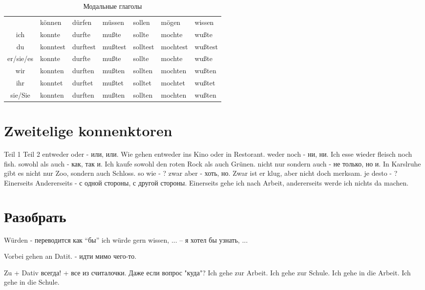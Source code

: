 \documentclass[12pt,a4paper]{report}
\begin{document}
\begin{longtable}{ c l l l l l l }
\caption{Модальные глаголы} \label{tab:long} \\
				& können 	& dürfen 	& müssen 	& sollen 	& mögen 	& wissen 	\\
	
	ich 		& konnte 	& durfte 	& mußte 	& sollte 	& mochte 	& wußte 	\\
	du 			& konntest 	& durftest	& mußtest	& solltest	& mochtest	& wußtest 	\\
	er/sie/es 	& konnte 	& durfte 	& mußte		& sollte	& mochte	& wußte		\\
	wir 		& konnten 	& durften 	& mußten	& sollten	& mochten	& wußten	\\
	ihr			& konntet 	& durftet 	& mußtet	& solltet	& mochtet	& wußtet	\\
	sie/Sie		& konnten 	& durften 	& mußten	& sollten	& mochten	& wußten	\\

\end{longtable}

\chapter{Zweitelige konnenktoren}

Teil 1 	Teil 2
entweder 	oder - или, или. Wie gehen entweder ins Kino oder in Restorant.
weder 	noch - ни, ни. Ich esse wieder fleisch noch fish.
sowohl 	als auch - как, так и. Ich kaufe sowohl den roten Rock als auch Grünen.
nicht nur 	sondern auch - не только, но и. In Karslruhe gibt es nicht nur Zoo, sondern auch Schloss.
so 	wie - ?
zwar 	aber - хоть, но. Zwar ist er klug, aber nicht doch merksam.
je 	desto - ?
Einerseits Andererseits - с одной стороны, с другой стороны. Einerseits gehe ich nach Arbeit, andererseits werde ich nichts da machen.


\chapter{Разобрать}

Würden - переводится как ``бы''
ich würde gern wissen, ... -- я хотел бы узнать, ...

Vorbei gehen an Datit. - идти мимо чего-то.

Zu + Dativ всегда! + все из считалочки. Даже если вопрос "куда"? 
Ich gehe zur Arbeit. Ich gehe zur Schule.
Ich gehe in die Arbeit. Ich gehe in die Schule.
\end{document}
